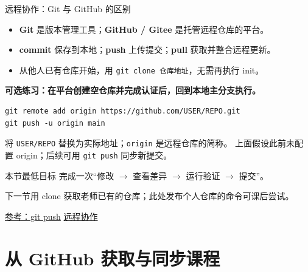 \documentclass[9pt]{ctexbeamer}
\begin{document}
\begin{frame}[fragile]{远程协作：Git 与 GitHub 的区别}
  \begin{itemize}
    \item \textbf{Git} 是版本管理工具；\textbf{GitHub / Gitee} 是托管远程仓库的平台。
    \item \textbf{commit} 保存到本地；\textbf{push} 上传提交；\textbf{pull} 获取并整合远程更新。
    \item 从他人已有仓库开始，用 \texttt{git clone 仓库地址}，无需再执行 init。
  \end{itemize}
  \textbf{可选练习：在平台创建空仓库并完成认证后，回到本地主分支执行。}
\begin{lstlisting}[language={},numbers=none]
git remote add origin https://github.com/USER/REPO.git
git push -u origin main
\end{lstlisting}
  \relax
  {\small 将 \texttt{USER/REPO} 替换为实际地址；\texttt{origin} 是远程仓库的简称。
  上面假设此前未配置 origin；后续可用 \texttt{git push} 同步新提交。}
  \begin{block}{本节最低目标}
    完成一次“修改 $\rightarrow$ 查看差异 $\rightarrow$ 运行验证 $\rightarrow$ 提交”。\par
    下一节用 clone 获取老师已有的仓库；此处发布个人仓库的命令可课后尝试。
  \end{block}
  {\tiny\href{https://git-scm.com/docs/git-push}{参考：git push}\quad
  \href{https://git-scm.com/docs/gittutorial}{远程协作}}
\end{frame}

\section{从 GitHub 获取与同步课程}
\end{document}
